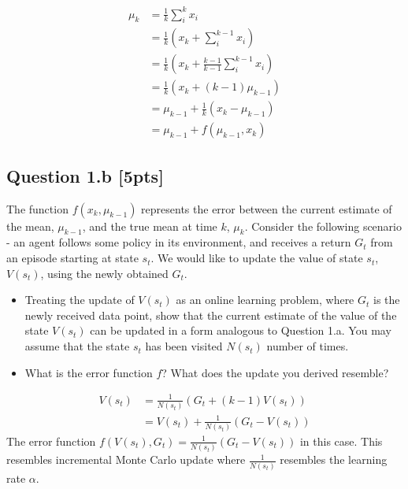 \documentclass[12pt]{article}
\begin{document}
\noindent
\begin{solution}
\begin{align*}
\mu_k &= \frac{1}{k}\sum_i^k x_i\\
&=\frac{1}{k}(x_k+\sum_i^{k-1} x_i)\\
&=\frac{1}{k}(x_k+\frac{k-1}{k-1}\sum_i^{k-1} x_i)\\
&=\frac{1}{k}(x_k+(k-1)\mu_{k-1})\\
&=\mu_{k-1} + \frac{1}{k}(x_k-\mu_{k-1})\\
&=\mu_{k-1} + f(\mu_{k-1}, x_k)
\end{align*}
\end{solution}

\subsection*{Question 1.b \textbf{[5pts]}}
The function $f(x_k, \mu_{k-1})$ represents the error between the current estimate of the mean, $\mu_{k-1}$, and the true mean at time $k$, $\mu_k$. Consider the following scenario - an agent follows some policy in its environment, and receives a return $G_t$ from an episode starting at state $s_t$. We would like to update the value of state $s_t$, $V(s_t)$, using the newly obtained $G_t$. 

\begin{itemize}
    \item Treating the update of $V(s_t)$ as an online learning problem, where $G_t$ is the newly received data point, show that the current estimate of the value of the state $V(s_t)$ can be updated in a form analogous to Question 1.a. You may assume that the state $s_t$ has been visited $N(s_t)$ number of times.
    
    \item What is the error function $f$? What does the update you derived resemble?  
\end{itemize}

\noindent
\begin{solution}
\begin{align*}
V(s_t) &= \frac{1}{N(s_t)}(G_t+(k-1)V(s_t))\\
&=V(s_t) + \frac{1}{N(s_t)}(G_t-V(s_t))
\end{align*}
The error function $f(V(s_t), G_t)=\frac{1}{N(s_t)}(G_t-V(s_t))$ in this case. This resembles incremental Monte Carlo update where $\frac{1}{N(s_t)}$ resembles the learning rate $\alpha$.
\end{solution}
\end{document}

